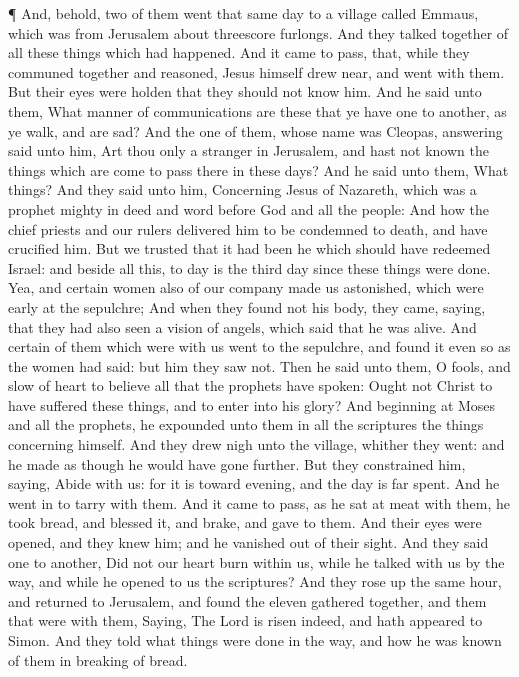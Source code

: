  ¶ And, behold, two of them went that same day to a village
called Emmaus, which was from Jerusalem about threescore furlongs.
 And they talked together of all these things which had
happened.  And it came to pass, that, while they communed
together and reasoned, Jesus himself drew near, and went with them.
 But their eyes were holden that they should not know him.
 And he said unto them, What manner of communications are
these that ye have one to another, as ye walk, and are sad?
 And the one of them, whose name was Cleopas, answering
said unto him, Art thou only a stranger in Jerusalem, and hast not known
the things which are come to pass there in these days?  And
he said unto them, What things? And they said unto him, Concerning Jesus
of Nazareth, which was a prophet mighty in deed and word before God and
all the people:  And how the chief priests and our rulers
delivered him to be condemned to death, and have crucified him.
 But we trusted that it had been he which should have
redeemed Israel: and beside all this, to day is the third day since
these things were done.  Yea, and certain women also of our
company made us astonished, which were early at the sepulchre;
 And when they found not his body, they came, saying, that
they had also seen a vision of angels, which said that he was alive.
 And certain of them which were with us went to the
sepulchre, and found it even so as the women had said: but him they saw
not.  Then he said unto them, O fools, and slow of heart to
believe all that the prophets have spoken:  Ought not
Christ to have suffered these things, and to enter into his glory?
 And beginning at Moses and all the prophets, he expounded
unto them in all the scriptures the things concerning himself.
 And they drew nigh unto the village, whither they went:
and he made as though he would have gone further.  But they
constrained him, saying, Abide with us: for it is toward evening, and
the day is far spent. And he went in to tarry with them. 
And it came to pass, as he sat at meat with them, he took bread, and
blessed it, and brake, and gave to them.  And their eyes
were opened, and they knew him; and he vanished out of their sight.
 And they said one to another, Did not our heart burn
within us, while he talked with us by the way, and while he opened to us
the scriptures?  And they rose up the same hour, and
returned to Jerusalem, and found the eleven gathered together, and them
that were with them,  Saying, The Lord is risen indeed, and
hath appeared to Simon.  And they told what things were
done in the way, and how he was known of them in breaking of bread.

